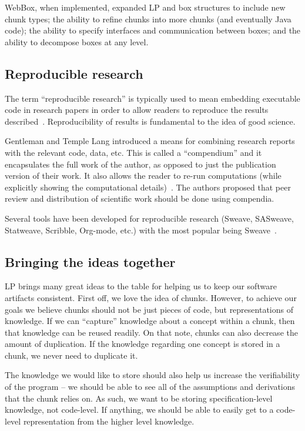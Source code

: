 \documentclass[preprint, 10pt]{sigplanconf}
\begin{document}
WebBox, when implemented, expanded LP and box structures to include new chunk
types; the ability to refine chunks into more chunks (and eventually Java code);
the ability to specify interfaces and communication between boxes; and the
ability to decompose boxes at any level.

\subsection{Reproducible research} 
\label{subsec:rr}

The term ``reproducible research'' is typically used to mean embedding
executable code in research papers in order to allow readers to reproduce the
results described~\cite{SchulteEtAl2012}. Reproducibility of results is
fundamental to the idea of good science.

Gentleman and Temple Lang introduced a means for combining research reports with
the relevant code, data, etc. This is called a ``compendium'' and it
encapsulates the full work of the author, as opposed to just the publication
version of their work. It also allows the reader to re-run computations (while
explicitly showing the computational details)~\cite{Lang2004}. The authors
proposed that peer review and distribution of scientific work should be done
using compendia.

Several tools have been developed for reproducible research (Sweave, SASweave,
Statweave, Scribble, Org-mode, etc.) with the most popular being
Sweave~\cite{SchulteEtAl2012}.

\subsection{Bringing the ideas together}
\label{subsec:ideas}

LP brings many great ideas to the table for helping us to keep our software
artifacts consistent. First off, we love the idea of chunks. However, to achieve
our goals we believe chunks should not be just pieces of code, but
representations of knowledge. If we can ``capture'' knowledge about a concept
within a chunk, then that knowledge can be reused readily. On that note, chunks
can also decrease the amount of duplication. If the knowledge regarding one
concept is stored in a chunk, we never need to duplicate it.

The knowledge we would like to store should also help us increase the
verifiability of the program -- we should be able to see all of the assumptions
and derivations that the chunk relies on. As such, we want to be storing
specification-level knowledge, not code-level. If anything, we should be able to
easily get to a code-level representation from the higher level knowledge.
\end{document}
